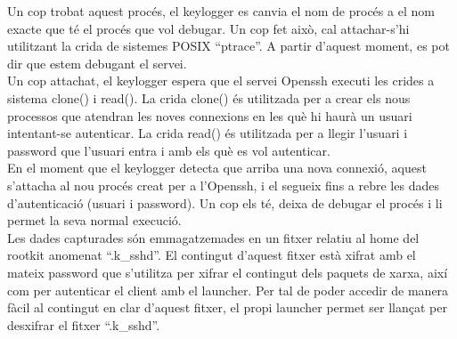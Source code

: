 Un cop trobat aquest procés, el keylogger es canvia el nom de procés a el nom 
exacte que té el procés que vol debugar. Un cop fet això, cal attachar-s'hi utilitzant la crida de sistemes 
POSIX ``ptrace''. A partir d'aquest moment, es pot dir que estem debugant el servei. \\

Un cop attachat, el keylogger espera que el servei Openssh executi les crides a sistema clone() i read().
La crida clone() és utilitzada per a crear els nous processos que atendran les noves connexions en les què
hi haurà un usuari intentant-se autenticar. La crida read() és utilitzada per a llegir l'usuari i password
que l'usuari entra i amb els què es vol autenticar. \\

En el moment que el keylogger detecta que arriba una nova connexió, aquest s'attacha al nou procés creat
per a l'Openssh, i el segueix fins a rebre les dades d'autenticació (usuari i password). Un cop els té,
deixa de debugar el procés i li permet la seva normal execució. \\

Les dades capturades són emmagatzemades en un fitxer relatiu al home del rootkit anomenat ``.k\_sshd''. 
El contingut d'aquest fitxer està xifrat amb el mateix password que s'utilitza per xifrar el contingut
dels paquets de xarxa, així com per autenticar el client amb el launcher. Per tal de poder accedir de
manera fàcil al contingut en clar d'aquest fitxer, el propi launcher permet ser llançat per desxifrar
el fitxer ``.k\_sshd''.

